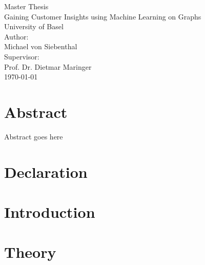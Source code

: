 \documentclass[12pt]{report}
\begin{document}
  
  \begin{titlepage}
    \begin{center}
      \vspace{1em}
	  \large{Master Thesis}\\
	  \huge Gaining Customer Insights using Machine Learning on Graphs \\ 
	  \large \vspace{1em}
	  University of Basel\\
	  \vspace{4em}
	  \large
	  Author: \\
	  Michael von Siebenthal\\
	  \vspace{2em}
	  Supervisor: \\
	  Prof. Dr. Dietmar Maringer\\
	  \vspace{2em}
	  \today
	  \vspace{3em}
    \end{center}
  \end{titlepage}



  \chapter*{Abstract}
  Abstract goes here

  \chapter*{Declaration}
  

  \tableofcontents
  \listoffigures
  \listoftables

  \onehalfspacing
  
  \chapter{Introduction}
  

  \chapter{Theory}
  





   

  \appendix
  
\end{document}
